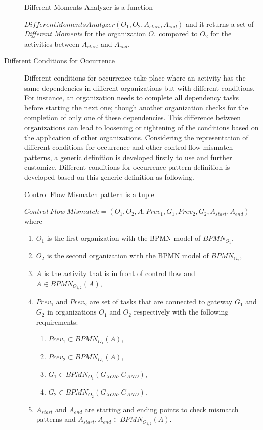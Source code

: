 \begin{description}
		\theoremstyle{definition}
		\begin{definition}
		Different Moments Analyzer is a function 

		$DifferentMomentsAnalyzer(O_{1}, O_{2}, A_{start}, A_{end})$ and it returns a set of \textit{Different Moments} for the organization $O_{1}$ compared to $O_{2}$ for the activities between $A_{start}$ and $A_{end}$.
		\end{definition}

	\item[Different Conditions for Occurrence] Different conditions for occurrence take place where an activity has the same dependencies in different organizations but with different conditions. For instance, an organization needs to complete all dependency tasks before starting the next one; though another organization checks for the completion of only one of these dependencies. This difference between organizations can lead to loosening or tightening of the conditions based on the application of other organizations. Considering the representation of different conditions for occurrence and other control flow mismatch patterns, a generic definition is developed firstly to use and further customize. Different conditions for occurrence pattern definition is developed based on this generic definition as following.
		\theoremstyle{definition}
		\begin{definition}
		Control Flow Mismatch pattern is a tuple 

		${Control\ Flow\ Mismatch} = (O_{1}, O_{2}, A, Prev_{1}, G_{1}, Prev_{2}, G_{2}, A_{start}, A_{end}) $ where 
		\begin{enumerate}
		  \item $O_{1}$ is the first organization with the BPMN model of $BPMN_{{O}_{1}}$,
		  \item $O_{2}$ is the second organization with the BPMN model of $BPMN_{{O}_{2}}$,
		  \item $A$ is the activity that is in front of control flow and $A \in BPMN_{{O}_{1,2}}(A)$,
		  \item $Prev_{1}$ and $Prev_{2}$ are set of tasks that are connected to gateway $G_{1}$ and $G_{2}$ in organizations $O_{1}$ and $O_{2}$ respectively with the following requirements:
			  \begin{enumerate}
				  \item $Prev_{1} \subset BPMN_{{O}_{1}}(A)$,
				  \item $Prev_{2} \subset BPMN_{{O}_{2}}(A)$,
				  \item $G_{1} \in BPMN_{{O}_{1}}(G_{XOR}, G_{AND})$,
	  			  \item $G_{2} \in BPMN_{{O}_{2}}(G_{XOR}, G_{AND})$.
			  \end {enumerate}
 		  \item $A_{start}$ and $A_{end}$ are starting and ending points to check mismatch patterns and $A_{start}, A_{end} \in BPMN_{{O}_{1,2}}(A)$. 
		\end{enumerate}
		\end{definition}


\end{description}
